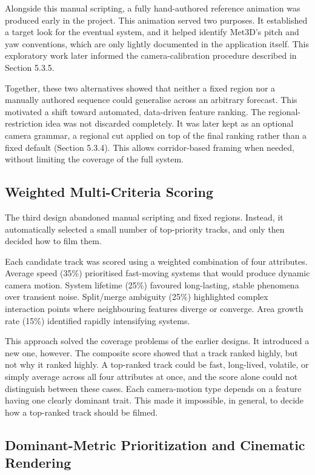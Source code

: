 \documentclass[journal abbreviation, manuscript]{copernicus}
\begin{document}
Alongside this manual scripting, a fully hand-authored reference
animation was produced early in the project. This animation served two
purposes. It established a target look for the eventual system, and it
helped identify Met3D's pitch and yaw conventions, which are only
lightly documented in the application itself. This exploratory work
later informed the camera-calibration procedure described in
Section 5.3.5.

Together, these two alternatives showed that neither a fixed region nor
a manually authored sequence could generalise across an arbitrary
forecast. This motivated a shift toward automated, data-driven feature
ranking. The regional-restriction idea was not discarded completely. It
was later kept as an optional camera grammar, a regional cut applied on
top of the final ranking rather than a fixed default (Section 5.3.4).
This allows corridor-based framing when needed, without limiting the
coverage of the full system.

\subsection{Weighted Multi-Criteria Scoring}

The third design abandoned manual scripting and fixed regions.
Instead, it automatically selected a small number of top-priority
tracks, and only then decided how to film them.

Each candidate track was scored using a weighted combination of four
attributes. Average speed (35\%) prioritised fast-moving systems that
would produce dynamic camera motion. System lifetime (25\%) favoured
long-lasting, stable phenomena over transient noise. Split/merge
ambiguity (25\%) highlighted complex interaction points where
neighbouring features diverge or converge. Area growth rate (15\%)
identified rapidly intensifying systems.

This approach solved the coverage problems of the earlier designs. It
introduced a new one, however. The composite score showed that a track
ranked highly, but not why it ranked highly. A top-ranked track could
be fast, long-lived, volatile, or simply average across all four
attributes at once, and the score alone could not distinguish between
these cases. Each camera-motion type depends on a feature having one
clearly dominant trait. This made it impossible, in general, to decide
how a top-ranked track should be filmed.

\subsection{Dominant-Metric Prioritization and Cinematic Rendering}
\end{document}
